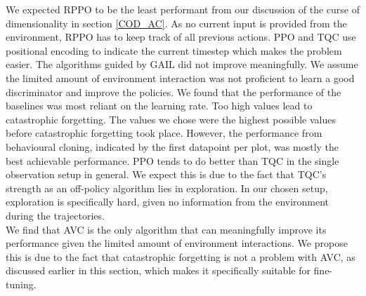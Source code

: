 We expected RPPO to be the least performant from our discussion of the curse of dimensionality in section \ref{COD_AC}. As no current input 
is provided from the environment, RPPO has to keep track of all previous actions. PPO and TQC use positional encoding to indicate the current 
timestep which makes the problem easier. The algorithms guided by GAIL did not improve meaningfully. We assume the limited amount of environment 
interaction was not proficient to learn a good discriminator and improve the policies. We found that the performance of the baselines was most 
reliant on the learning rate. Too high values lead to catastrophic forgetting. The values we chose were the highest possible values before 
catastrophic forgetting took place. However, the performance from behavioural cloning, indicated by the first datapoint per plot, was mostly 
the best achievable performance. PPO tends to do better than TQC in the single observation setup in general. We expect this is due to the 
fact that TQC's strength as an off-policy algorithm lies in exploration. In our chosen setup, exploration is specifically hard, given no 
information from the environment during the trajectories.\\

We find that AVC is the only algorithm that can meaningfully improve its performance given the limited amount of environment interactions. 
We propose this is due to the fact that catastrophic forgetting is not a problem with AVC, as discussed earlier in this section, which makes 
it specifically suitable for fine-tuning.

